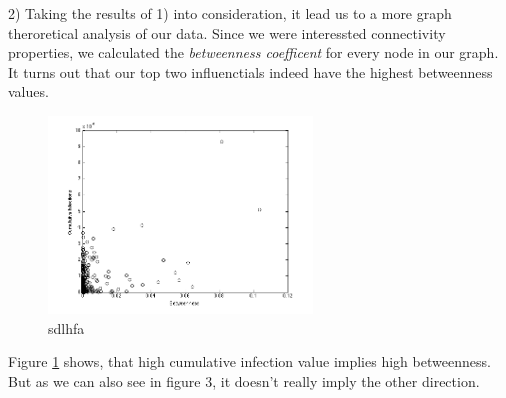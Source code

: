 2) Taking the results of 1) into consideration, it lead us to a more graph theroretical analysis of our data. Since we were interessted connectivity properties, we calculated the \textit{betweenness coefficent} for every node in our graph. 
It turns out that our top two influenctials indeed have the highest betweenness values. 

\begin{figure}
\includegraphics[width=7cm]{influ4}
\caption{sdlhfa}
\label{Betweenness}
\end{figure}

Figure \ref{Betweenness} shows, that high cumulative infection value implies high betweenness. But as we can also see in figure 3, it doesn't really imply the other direction.



